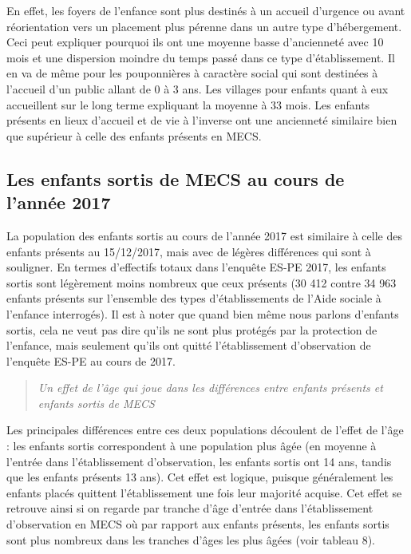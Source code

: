 \documentclass[
  12,
  a4paper,
]{report}
\begin{document}
En effet, les foyers de l'enfance sont plus destinés à un accueil
d'urgence ou avant réorientation vers un placement plus pérenne dans un
autre type d'hébergement. Ceci peut expliquer pourquoi ils ont une
moyenne basse d'ancienneté avec 10 mois et une dispersion moindre du
temps passé dans ce type d'établissement. Il en va de même pour les
pouponnières à caractère social qui sont destinées à l'accueil d'un
public allant de 0 à 3 ans. Les villages pour enfants quant à eux
accueillent sur le long terme expliquant la moyenne à 33 mois. Les
enfants présents en lieux d'accueil et de vie à l'inverse ont une
ancienneté similaire bien que supérieur à celle des enfants présents en
MECS.

\hypertarget{les-enfants-sortis-de-mecs-au-cours-de-lannuxe9e-2017}{%
\subsection{Les enfants sortis de MECS au cours de l'année
2017}\label{les-enfants-sortis-de-mecs-au-cours-de-lannuxe9e-2017}}

La population des enfants sortis au cours de l'année 2017 est similaire
à celle des enfants présents au 15/12/2017, mais avec de légères
différences qui sont à souligner. En termes d'effectifs totaux dans
l'enquête ES-PE 2017, les enfants sortis sont légèrement moins nombreux
que ceux présents (30 412 contre 34 963 enfants présents sur l'ensemble
des types d'établissements de l'Aide sociale à l'enfance interrogés). Il
est à noter que quand bien même nous parlons d'enfants sortis, cela ne
veut pas dire qu'ils ne sont plus protégés par la protection de
l'enfance, mais seulement qu'ils ont quitté l'établissement
d'observation de l'enquête ES-PE au cours de 2017.

\begin{quote}
\emph{Un effet de l'âge qui joue dans les différences entre enfants
présents et enfants sortis de MECS}
\end{quote}

Les principales différences entre ces deux populations découlent de
l'effet de l'âge : les enfants sortis correspondent à une population
plus âgée (en moyenne à l'entrée dans l'établissement d'observation, les
enfants sortis ont 14 ans, tandis que les enfants présents 13 ans). Cet
effet est logique, puisque généralement les enfants placés quittent
l'établissement une fois leur majorité acquise. Cet effet se retrouve
ainsi si on regarde par tranche d'âge d'entrée dans l'établissement
d'observation en MECS où par rapport aux enfants présents, les enfants
sortis sont plus nombreux dans les tranches d'âges les plus âgées (voir
tableau 8).
\end{document}
